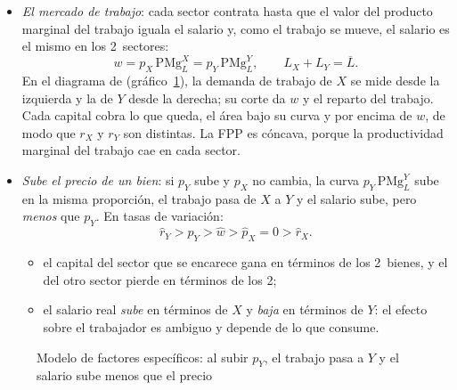 \documentclass[11pt]{article}
\begin{document}
\begin{itemize}
\item \emph{El mercado de trabajo}: cada sector contrata hasta que el valor del producto marginal del trabajo iguala el salario y, como el trabajo se mueve, el salario es el mismo en los 2~sectores:
  \begin{equation}\label{eq:especificos-salario}
  w=p_X\,\mathrm{PMg}_L^X=p_Y\,\mathrm{PMg}_L^Y,\qquad L_X+L_Y=\overline L.
  \end{equation}
  En el diagrama de \textcite{Mussa1974Tariffs} (gráfico~\ref{fig:especificos}), la demanda de trabajo de $X$ se mide desde la izquierda y la de $Y$ desde la derecha; su corte da $w$ y el reparto del trabajo. Cada capital cobra lo que queda, el área bajo su curva y por encima de $w$, de modo que $r_X$ y $r_Y$ son distintas. La FPP es cóncava, porque la productividad marginal del trabajo cae en cada sector.
\item \emph{Sube el precio de un bien}: si $p_Y$ sube y $p_X$ no cambia, la curva $p_Y\,\mathrm{PMg}_L^Y$ sube en la misma proporción, el trabajo pasa de $X$ a $Y$ y el salario sube, pero \emph{menos} que $p_Y$. En tasas de variación\nocite{Jones1971Three}:
  \begin{equation}\label{eq:especificos-magnificacion}
  \hat r_Y>\hat p_Y>\hat w>\hat p_X=0>\hat r_X.
  \end{equation}
  \begin{itemize}
  \item el capital del sector que se encarece gana en términos de los 2~bienes, y el del otro sector pierde en términos de los 2;
  \item el salario real \emph{sube} en términos de $X$ y \emph{baja} en términos de $Y$: el efecto sobre el trabajador es ambiguo y depende de lo que consume.
  \end{itemize}
\end{itemize}
\begin{figure}[H]
\centering
\caption{Modelo de factores específicos: al subir $p_Y$, el trabajo pasa a $Y$ y el salario sube menos que el precio}\label{fig:especificos}
\end{figure}
\end{document}
